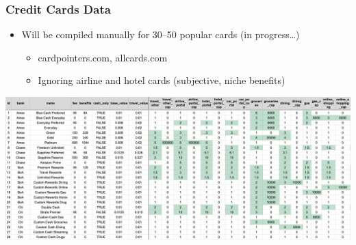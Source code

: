 \begin{frame}
    \frametitle{Credit Cards Data}
    \begin{itemize}
        \item Will be compiled manually for 30--50 popular cards (in progress\ldots)
        \begin{itemize}
            \item cardpointers.com, allcards.com
            \item Ignoring airline and hotel cards (subjective, niche benefits)
        \end{itemize}    
    \end{itemize}
    \begin{center}
        \includegraphics[width=1.0\textwidth]{../Misc/CreditCardTable.png}
    \end{center}    
\end{frame}    

